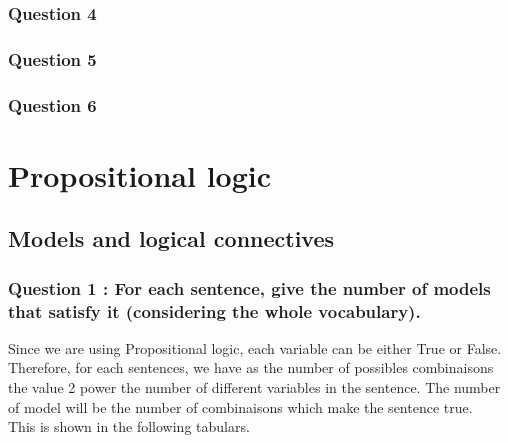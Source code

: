 \documentclass[a4paper,10pt]{article}
\begin{document}
\subsubsection{Question 4}
\subsubsection{Question 5}
\subsubsection{Question 6}



	
\newpage
	
	
	

\section{Propositional logic}
\subsection*{Models and logical connectives}

\subsubsection*{Question 1 : For each sentence, give the number of models that satisfy it (considering the
whole vocabulary).\\}

Since we are using Propositional logic, each variable can be either True or False. Therefore, for each sentences, we have as the number of possibles combinaisons the value 2 power the number of different variables in the sentence. The number of model will be the number of combinaisons which make the sentence true. \\
This is shown in the following tabulars. \\
\end{document}
